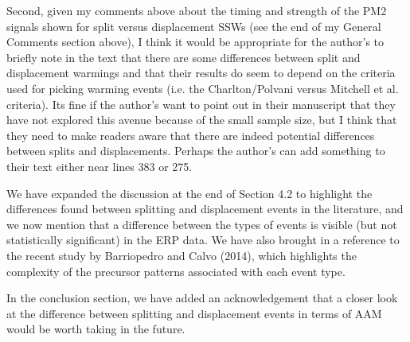 \documentclass[a4paper,10pt]{article}
\begin{document}
\textcolor{reviewer}{Second, given my comments above about the timing and strength of the PM2 signals
shown for split versus displacement SSWs (see the end of my General Comments section above),
I think it would be appropriate for the author’s to briefly note in the text that there
are some differences between split and displacement warmings and that their results do
seem to depend on the criteria used for picking warming events (i.e. the Charlton/Polvani
versus Mitchell et al. criteria). Its fine if the author’s want to point out in their manuscript
that they have not explored this avenue because of the small sample size, but I think that
they need to make readers aware that there are indeed potential differences between splits
and displacements. Perhaps the author’s can add something to their text either near lines
383 or 275.}
\vspace{0.5cm}


We have expanded the discussion at the end of Section 4.2 to highlight the differences found between splitting and displacement events in the literature, and we now mention that a difference between the types of events is visible (but not statistically significant) in the ERP data.
We have also brought in a reference to the recent study  by Barriopedro and Calvo (2014), which highlights the complexity of the precursor patterns associated with each event type.  

In the conclusion section, we have added an acknowledgement that a closer look at the difference between splitting and displacement events in terms of AAM would be worth taking in the future.  
\end{document}
